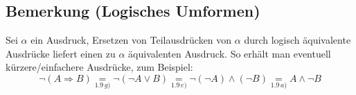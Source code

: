 \documentclass[10pt,a4paper,titlepage,fleqn]{article}
\begin{document}
\subsection{Bemerkung (Logisches Umformen)}
	Sei $\alpha$ ein Ausdruck, Ersetzen von Teilausdrücken von $\alpha$ durch logisch
 	äquivalente Ausdrücke liefert einen zu $\alpha$ äquivalenten Ausdruck. So erhält man
 	eventuell kürzere/einfachere Ausdrücke, zum Beispiel:
	\[\neg (A\Rightarrow B) \underset{1.9\,g)}{=}\neg(\neg A\vee B) \underset{1.9\, e)}{=}\neg(\neg A) \wedge (\neg B) \underset{1.9\, a)}{=}A\wedge \neg B\]
\end{document}
